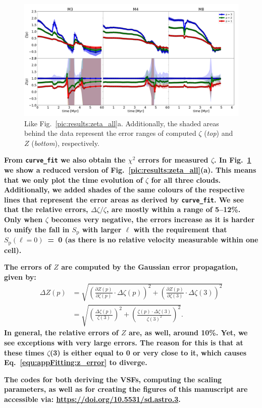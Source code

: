 \begin{figure}
    \centering
    \includegraphics[width=\textwidth]{error_vsf04_zeta_z.pdf}
    \caption{
        Like Fig.~\ref{pic:results:zeta_all}a.
        Additionally, the shaded areas behind the data represent the error ranges of computed $\zeta$ (\textit{top}) and $Z$ (\textit{bottom}), respectively. 
    }
    \label{pic:appFitting:error_vsfhr04_zeta_z}
\end{figure}


\textbf{
    From \texttt{curve\_fit} we also obtain the $\chi^2$ errors for measured $\zeta$. 
    In Fig.~\ref{pic:appFitting:error_vsfhr04_zeta_z} we show a reduced version of Fig.~\ref{pic:results:zeta_all}(a).
    This means that we only plot the time evolution of $\zeta$ for all three clouds.
    Additionally, we added shades of the same colours of the respective lines that represent the error areas as derived by \texttt{curve\_fit}.
    We see that the relative errors, $\Delta \zeta / \zeta$, are mostly within a range of 5--12\%. 
    Only when $\zeta$ becomes very negative, the errors increase as it is harder to unify the fall in $S_\mathrm{p}$ with larger $\ell$ with the requirement that $S_\mathrm{p} (\ell=0)$~=~0 (as there is no relative velocity measurable within one cell).
}

\textbf{
    The errors of $Z$ are computed by the Gaussian error propagation, given by:
}
\begin{align}\Delta Z(p) &= \sqrt{ \left( \frac{\partial Z(p)}{\partial \zeta(p)} \cdot \Delta\zeta(p) \right)^2 + \left( \frac{\partial Z(p)}{\partial \zeta(3)} \cdot \Delta\zeta(3) \right)^2 } \\
        &= \sqrt{ \left( \frac{\Delta\zeta(p)}{\zeta(3)} \right)^2 + \left( \frac{ \zeta(p) \cdot \Delta\zeta(3)}{\zeta(3)^2} \right)^2 }.
        \label{equ:appFitting:z_error}
\end{align}
\textbf{
    In general, the relative errors of $Z$ are, as well, around 10\%.
    Yet, we see exceptions with very large errors. 
    The reason for this is that at these times $\zeta$(3) is either equal to 0 or very close to it, which causes Eq.~\ref{equ:appFitting:z_error} to diverge.
}

\textbf{
    The codes for both deriving the VSFs, computing the scaling parameters, as well as for creating the figures of this manuscript are accessible via: \newline
    {\url{https://doi.org/10.5531/sd.astro.3}}.
}


\endinput
